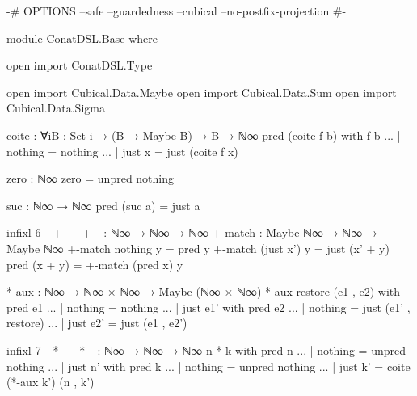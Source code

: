 \begin{code}[hide]
{-# OPTIONS --safe --guardedness --cubical --no-postfix-projection #-}

module ConatDSL.Base where

open import ConatDSL.Type

open import Cubical.Data.Maybe
open import Cubical.Data.Sum
open import Cubical.Data.Sigma

coite : ∀{i}{B : Set i} → (B → Maybe B) → B → ℕ∞
pred (coite f b) with f b
... | nothing = nothing
... | just x  = just (coite f x)

zero : ℕ∞
zero = unpred nothing

suc : ℕ∞ → ℕ∞
pred (suc a) = just a

infixl 6 _+_
_+_ : ℕ∞ → ℕ∞ → ℕ∞
+-match : Maybe ℕ∞ → ℕ∞ → Maybe ℕ∞
+-match nothing    y = pred y
+-match (just x')  y = just (x' + y)
pred (x + y) = +-match (pred x) y

*-aux : ℕ∞ → ℕ∞ × ℕ∞ → Maybe (ℕ∞ × ℕ∞)
*-aux restore (e1 , e2) with pred e1
... | nothing = nothing
... | just e1' with pred e2
... | nothing = just (e1' , restore)
... | just e2' = just (e1 , e2')

infixl 7 _*_
_*_ : ℕ∞ → ℕ∞ → ℕ∞
n * k with pred n
... | nothing = unpred nothing
... | just n' with pred k
... | nothing = unpred nothing
... | just k' = coite (*-aux k') (n , k')
\end{code}
